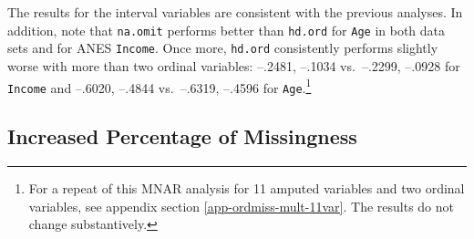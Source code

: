 \documentclass[12pt,econ]{sources/authesis}
\begin{document}
The results for the interval variables are consistent with the previous analyses. In addition, note that \texttt{na.omit} performs better than \texttt{hd.ord} for \texttt{Age} in both data sets and for ANES \texttt{Income}. Once more, \texttt{hd.ord} consistently performs slightly worse with more than two ordinal variables: --.2481, --.1034 vs.~--.2299, --.0928 for \texttt{Income} and --.6020, --.4844 vs.~--.6319, --.4596 for \texttt{Age}.\footnote{For a repeat of this MNAR analysis for 11 amputed variables and two ordinal variables, see appendix section \ref{app-ordmiss-mult-11var}. The results do not change substantively.}

\hypertarget{ordmiss-results-increaseNA}{%
\subsection{Increased Percentage of Missingness}\label{ordmiss-results-increaseNA}}
\end{document}
